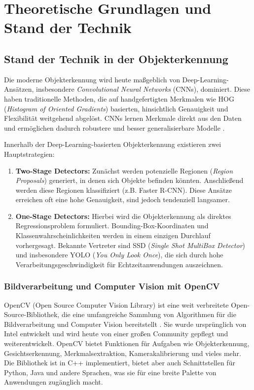 \section{Theoretische Grundlagen und Stand der Technik}

\subsection{Stand der Technik in der Objekterkennung}

Die moderne Objekterkennung wird heute maßgeblich von Deep-Learning-Ansätzen, insbesondere \textit{Convolutional Neural Networks} (CNNs), dominiert. Diese haben traditionelle Methoden, die auf handgefertigten Merkmalen wie HOG (\textit{Histogram of Oriented Gradients}) basierten, hinsichtlich Genauigkeit und Flexibilität weitgehend abgelöst. CNNs lernen Merkmale direkt aus den Daten und ermöglichen dadurch robustere und besser generalisierbare Modelle \cite{ultralytics_cv_2025}.

Innerhalb der Deep-Learning-basierten Objekterkennung existieren zwei Hauptstrategien:

\begin{enumerate}
    \item \textbf{Two-Stage Detectors:} Zunächst werden potenzielle Regionen (\textit{Region Proposals}) generiert, in denen sich Objekte befinden könnten. Anschließend werden diese Regionen klassifiziert (z.B. Faster R-CNN). Diese Ansätze erreichen oft eine hohe Genauigkeit, sind jedoch tendenziell langsamer.
    \item \textbf{One-Stage Detectors:} Hierbei wird die Objekterkennung als direktes Regressionsproblem formuliert. Bounding-Box-Koordinaten und Klassenwahrscheinlichkeiten werden in einem einzigen Durchlauf vorhergesagt. Bekannte Vertreter sind SSD (\textit{Single Shot MultiBox Detector}) und insbesondere YOLO (\textit{You Only Look Once}), die sich durch hohe Verarbeitungsgeschwindigkeit für Echtzeitanwendungen auszeichnen.
\end{enumerate}

\subsubsection{Bildverarbeitung und Computer Vision mit OpenCV}

OpenCV (Open Source Computer Vision Library) ist eine weit verbreitete Open-Source-Bibliothek, die eine umfangreiche Sammlung von Algorithmen für die Bildverarbeitung und Computer Vision bereitstellt \cite{culjak2012opencv}. Sie wurde ursprünglich von Intel entwickelt und wird heute von einer großen Community gepflegt und weiterentwickelt. OpenCV bietet Funktionen für Aufgaben wie Objekterkennung, Gesichtserkennung, Merkmalsextraktion, Kamerakalibrierung und vieles mehr. Die Bibliothek ist in C++ implementiert, bietet aber auch Schnittstellen für Python, Java und andere Sprachen, was sie für eine breite Palette von Anwendungen zugänglich macht.

